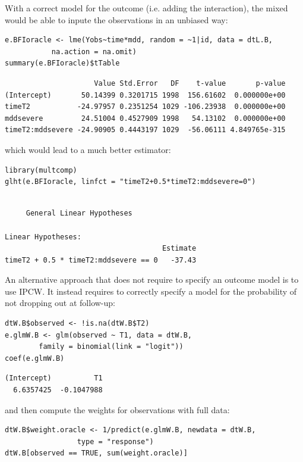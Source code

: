 \documentclass[12pt]{article}
\begin{document}
With a correct model for the outcome (i.e. adding the interaction),
the mixed would be able to inpute the observations in an unbiased way:
\lstset{language=r,label= ,caption= ,captionpos=b,numbers=none}
\begin{lstlisting}
e.BFIoracle <- lme(Yobs~time*mdd, random = ~1|id, data = dtL.B,
		   na.action = na.omit)
summary(e.BFIoracle)$tTable
\end{lstlisting}

\begin{verbatim}
                     Value Std.Error   DF    t-value       p-value
(Intercept)       50.14399 0.3201715 1998  156.61602  0.000000e+00
timeT2           -24.97957 0.2351254 1029 -106.23938  0.000000e+00
mddsevere         24.51004 0.4527909 1998   54.13102  0.000000e+00
timeT2:mddsevere -24.90905 0.4443197 1029  -56.06111 4.849765e-315
\end{verbatim}


which would lead to a much better estimator:
\lstset{language=r,label= ,caption= ,captionpos=b,numbers=none}
\begin{lstlisting}
library(multcomp)
glht(e.BFIoracle, linfct = "timeT2+0.5*timeT2:mddsevere=0")
\end{lstlisting}

\begin{verbatim}

	 General Linear Hypotheses

Linear Hypotheses:
                                     Estimate
timeT2 + 0.5 * timeT2:mddsevere == 0   -37.43
\end{verbatim}



\bigskip

An alternative approach that does not require to specify an outcome
model is to use IPCW. It instead requires to correctly specify a model
for the probability of not dropping out at follow-up:
\lstset{language=r,label= ,caption= ,captionpos=b,numbers=none}
\begin{lstlisting}
dtW.B$observed <- !is.na(dtW.B$T2)
e.glmW.B <- glm(observed ~ T1, data = dtW.B,
		family = binomial(link = "logit"))
coef(e.glmW.B)
\end{lstlisting}

\begin{verbatim}
(Intercept)          T1 
  6.6357425  -0.1047988
\end{verbatim}


and then compute the weights for observations with full data:
\lstset{language=r,label= ,caption= ,captionpos=b,numbers=none}
\begin{lstlisting}
dtW.B$weight.oracle <- 1/predict(e.glmW.B, newdata = dtW.B,
				 type = "response")
dtW.B[observed == TRUE, sum(weight.oracle)]
\end{lstlisting}
\end{document}
